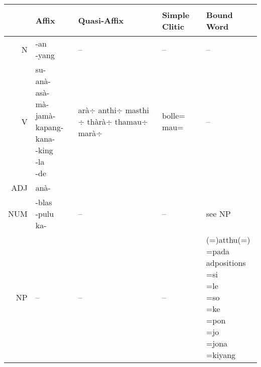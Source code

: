 \begin{table}
	\centering
		\begin{tabular}{r|llll}
& \parbox{2cm}{\begin{center}Affix       \end{center}} & Quasi-Affix & Simple Clitic & Bound Word\\						\hline
   N & \parbox{2cm}{\vspace{.2cm}-an\\-yang} &  --   & --  &  --   \vspace{.2cm} \\
 V & \parbox{2cm}{\vspace{.2cm}su-\\anà-\\asà-\\mà-\\jamà-\\kapang-}\parbox{2cm}{kana-\\-king\\-la\\-de}
 &\parbox{2cm}{\vspace{.2cm}arà$\div$\\anthi$\div$\\masthi$\div$\\thàrà$\div$\\thamau$\div$\\marà$\div$}&\parbox{2cm}{bolle=\\mau=} & -- \vspace{.2cm}\\
\hline
ADJ & anà- & &\vspace{.2cm} \\
NUM &	\parbox{2cm}{\vspace{.2cm}-blas\\-pulu\\ka-}&  -- & --  &  see NP\vspace{.2cm}\\
\hline
NP &  --   &    --    &  -- & \parbox{2cm}{\vspace{.2cm}(=)atthu(=)\\=pada\\ adpositions\\=si\\=le\\=so\\=ke\\=pon\\=jo\\=jona\\=kiyang\vspace{.2cm}}\\

\end{tabular}
\end{table}
